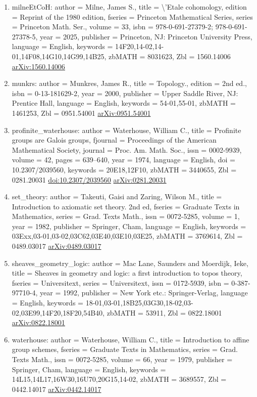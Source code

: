 \documentclass[11pt]{article}
\begin{document}
\begin{enumerate}[leftmargin=*]
  \item milneEtCoH: author = Milne, James S., title = \textbackslash{}'Etale cohomology, edition = Reprint of the 1980 edition, fseries = Princeton Mathematical Series, series = Princeton Math. Ser., volume = 33, isbn = 978-0-691-27379-2; 978-0-691-27378-5, year = 2025, publisher = Princeton, NJ: Princeton University Press, language = English, keywords = 14F20,14-02,14-01,14F08,14G10,14G99,14B25, zbMATH = 8031623, Zbl = 1560.14006 \href{https://arxiv.org/abs/1560.14006}{arXiv:1560.14006}
  \item munkrs: author = Munkres, James R., title = Topology., edition = 2nd ed., isbn = 0-13-181629-2, year = 2000, publisher = Upper Saddle River, NJ: Prentice Hall, language = English, keywords = 54-01,55-01, zbMATH = 1461253, Zbl = 0951.54001 \href{https://arxiv.org/abs/0951.54001}{arXiv:0951.54001}
  \item profinite\_waterhouse: author = Waterhouse, William C., title = Profinite groups are Galois groups, fjournal = Proceedings of the American Mathematical Society, journal = Proc. Am. Math. Soc., issn = 0002-9939, volume = 42, pages = 639--640, year = 1974, language = English, doi = 10.2307/2039560, keywords = 20E18,12F10, zbMATH = 3440655, Zbl = 0281.20031 \href{https://doi.org/10.2307/2039560}{doi:10.2307/2039560} \href{https://arxiv.org/abs/0281.20031}{arXiv:0281.20031}
  \item set\_theory: author = Takeuti, Gaisi and Zaring, Wilson M., title = Introduction to axiomatic set theory. 2nd ed, fseries = Graduate Texts in Mathematics, series = Grad. Texts Math., issn = 0072-5285, volume = 1, year = 1982, publisher = Springer, Cham, language = English, keywords = 03Exx,03-01,03-02,03C62,03E40,03E10,03E25, zbMATH = 3769614, Zbl = 0489.03017 \href{https://arxiv.org/abs/0489.03017}{arXiv:0489.03017}
  \item sheaves\_geometry\_logic: author = Mac Lane, Saunders and Moerdijk, Ieke, title = Sheaves in geometry and logic: a first introduction to topos theory, fseries = Universitext, series = Universitext, issn = 0172-5939, isbn = 0-387-97710-4, year = 1992, publisher = New York etc.: Springer-Verlag, language = English, keywords = 18-01,03-01,18B25,03G30,18-02,03-02,03E99,14F20,18F20,54B40, zbMATH = 53911, Zbl = 0822.18001 \href{https://arxiv.org/abs/0822.18001}{arXiv:0822.18001}
  \item waterhouse: author = Waterhouse, William C., title = Introduction to affine group schemes, fseries = Graduate Texts in Mathematics, series = Grad. Texts Math., issn = 0072-5285, volume = 66, year = 1979, publisher = Springer, Cham, language = English, keywords = 14L15,14L17,16W30,16U70,20G15,14-02, zbMATH = 3689557, Zbl = 0442.14017 \href{https://arxiv.org/abs/0442.14017}{arXiv:0442.14017}
\end{enumerate}

% 
% 
\end{document}
